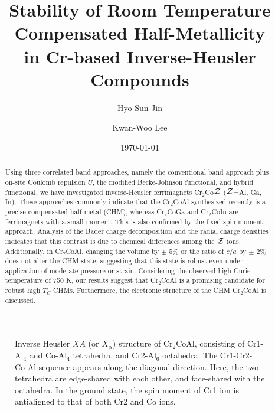 \documentclass[preprint,5p]{elsarticle}
\newcommand{\cca}{Cr$_2$CoAl}
\begin{document}
\title{Stability of Room Temperature Compensated Half-Metallicity\\
in Cr-based Inverse-Heusler Compounds}
\author[1]{Hyo-Sun Jin}
\author[1,2]{Kwan-Woo Lee}

\address[1]{Department of Applied Physics, Graduate School, Korea University, Sejong 30019, Korea}
\address[2]{Division of Display and Semiconductor Physics, Korea University, Sejong 30019, Korea}
\date{\today}

\begin{abstract}
Using three correlated band approaches, namely the conventional band approach plus on-site Coulomb repulsion $U$, 
the modified Becke-Johnson functional, and hybrid functional, we have investigated 
inverse-Heusler ferrimagnets Cr$_2$Co${\cal Z}$ (${\cal Z}$=Al, Ga, In).
These approaches commonly indicate that the Cr$_2$CoAl synthesized recently
is a precise compensated half-metal (CHM), 
whereas Cr$_2$CoGa and Cr$_2$CoIn are ferrimagnets with a small moment.
This is also confirmed by the fixed spin moment approach. 
Analysis of the Bader charge decomposition and the radial charge densities
indicates that this contrast is due to chemical differences among the ${\cal Z}$ ions.
Additionally, in Cr$_2$CoAl, changing the volume by $\pm$ 5\% or the ratio of $c/a$ by $\pm$ 2\% 
does not alter the CHM state, 
suggesting that this state is robust even under application of moderate pressure or strain.
Considering the observed high Curie temperature of 750 K,
our results suggest that Cr$_2$CoAl is a promising candidate for robust high $T_C$ CHMs.
Furthermore, the electronic structure of the CHM Cr$_2$CoAl is discussed.
\end{abstract}
\maketitle


\begin{figure}[tbp]
{}
\caption{Inverse Heusler $XA$ (or $X_\alpha$) structure of \cca,
consisting of Cr1-Al$_4$ and Co-Al$_4$ tetrahedra, and Cr2-Al$_6$ octahedra. 
The Cr1-Cr2-Co-Al sequence appears along the diagonal direction.
Here, the two tetrahedra are edge-shared with each other,
and face-shared with the octahedra.
In the ground state, the spin moment of Cr1 ion is antialigned 
to that of both Cr2 and Co ions.
}
\label{str}
\end{figure}
\end{document}
